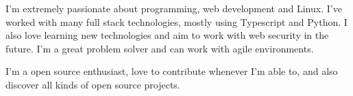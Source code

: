 

\begin{cvparagraph}

I'm extremely passionate about programming, web development
and Linux.
I've worked with many full stack technologies, mostly using
Typescript and Python. I also love learning new
technologies and aim to work with web security in the future.
I'm a great problem solver and can work with agile
environments.
\end{cvparagraph}

\begin{cvparagraph}

I'm a open source enthusiast, love to contribute whenever I'm able to,
and also discover all kinds of open source projects.


\end{cvparagraph}